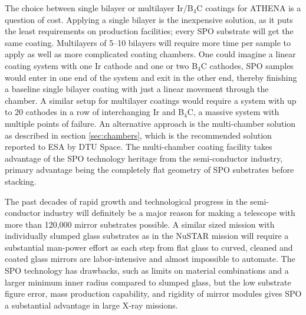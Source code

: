 The choice between single bilayer or multilayer Ir/B$_4$C coatings for ATHENA is a question of cost. Applying a single bilayer is the inexpensive solution, as it puts the least requirements on production facilities; every SPO substrate will get the same coating. Multilayers of 5--10 bilayers will require more time per sample to apply as well as more complicated coating chambers. One could imagine a linear coating system with one Ir cathode and one or two B$_4$C cathodes, SPO samples would enter in one end of the system and exit in the other end, thereby finishing a baseline single bilayer coating with just a linear movement through the chamber. A similar setup for multilayer coatings would require a system with up to 20 cathodes in a row of interchanging Ir and B$_4$C, a massive system with multiple points of failure. An alternative approach is the multi-chamber solution as described in section \ref{sec:chambers}, which is the recommended solution reported to ESA by DTU Space. The multi-chamber coating facility takes advantage of the SPO technology heritage from the semi-conductor industry, primary advantage being the completely flat geometry of SPO substrates before stacking.

The past decades of rapid growth and technological progress in the semi-conductor industry will definitely be a major reason for making a telescope with more than 120,000 mirror substrates possible. A similar sized mission with individually slumped glass substrates as in the NuSTAR mission will require a substantial man-power effort as each step from flat glass to curved, cleaned and coated glass mirrors are labor-intensive and almost impossible to automate. The SPO technology has drawbacks, such as limits on material combinations and a larger minimum inner radius compared to slumped glass, but the low substrate figure error, mass production capability, and rigidity of mirror modules gives SPO a substantial advantage in large X-ray missions.

